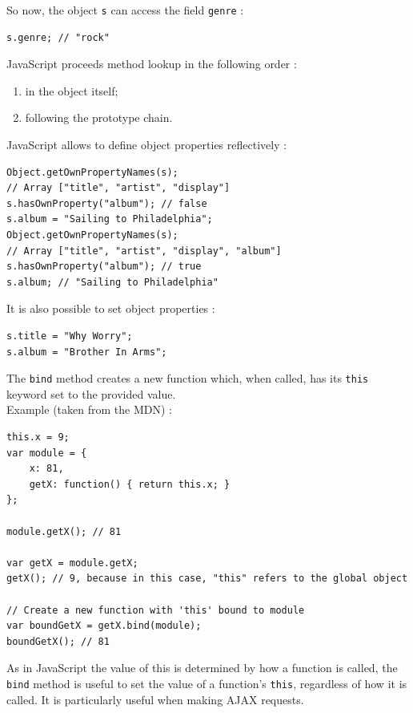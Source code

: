 \documentclass[a4paper,10pt]{article}
\begin{document}
So now, the object \lstinline|s| can access the field \lstinline|genre| :
\begin{lstlisting}
s.genre; // "rock"
\end{lstlisting}

JavaScript proceeds method lookup in the following order :
\begin{enumerate}
\item in the object itself;
\item following the prototype chain.
\end{enumerate}


\bigskip
JavaScript allows to define object properties reflectively :
\begin{lstlisting}
Object.getOwnPropertyNames(s);
// Array ["title", "artist", "display"]
s.hasOwnProperty("album"); // false
s.album = "Sailing to Philadelphia";
Object.getOwnPropertyNames(s);
// Array ["title", "artist", "display", "album"]
s.hasOwnProperty("album"); // true
s.album; // "Sailing to Philadelphia"
\end{lstlisting}

It is also possible to set object properties :
\begin{lstlisting}
s.title = "Why Worry";
s.album = "Brother In Arms";
\end{lstlisting}


\medskip
\label{bind}
The \lstinline|bind| method creates a new function which, when called, has its \lstinline|this| keyword set to the provided value. \\
Example (taken from the MDN) : \\
\begin{lstlisting}
this.x = 9;
var module = {
	x: 81,
	getX: function() { return this.x; }
};

module.getX(); // 81

var getX = module.getX;
getX(); // 9, because in this case, "this" refers to the global object

// Create a new function with 'this' bound to module
var boundGetX = getX.bind(module);
boundGetX(); // 81
\end{lstlisting}

As in JavaScript the value of this is determined by how a function is called, the \lstinline|bind| method is useful to set the value of a function’s \lstinline|this|, regardless of how it is called.
It is particularly useful when making AJAX requests.
\end{document}

